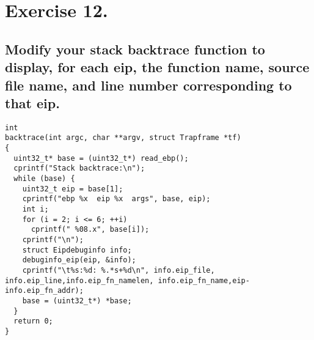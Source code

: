 \documentclass[a4paper]{article}
\begin{document}
\section{Exercise 12.}
	\subsection{Modify your stack backtrace function to display, for each eip, the function name, source file name, and line number corresponding to that eip.}
	\begin{center}
		\begin{minipage}{0.7\textwidth}
			\begin{lstlisting}
int
backtrace(int argc, char **argv, struct Trapframe *tf)
{
  uint32_t* base = (uint32_t*) read_ebp();
  cprintf("Stack backtrace:\n");
  while (base) {
    uint32_t eip = base[1];
    cprintf("ebp %x  eip %x  args", base, eip);
    int i;
    for (i = 2; i <= 6; ++i)
      cprintf(" %08.x", base[i]);
    cprintf("\n");
    struct Eipdebuginfo info;
    debuginfo_eip(eip, &info);
    cprintf("\t%s:%d: %.*s+%d\n", info.eip_file, info.eip_line,info.eip_fn_namelen, info.eip_fn_name,eip-info.eip_fn_addr);
    base = (uint32_t*) *base;
  }
  return 0;
}
			\end{lstlisting}
		\end{minipage}
	\end{center}
	
\end{document}
